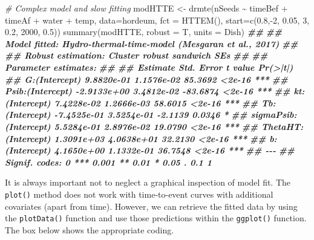 \documentclass[
]{book}
\newenvironment{Shaded}{\begin{snugshade}}{\end{snugshade}}
\newcommand{\AttributeTok}[1]{\textcolor[rgb]{0.77,0.63,0.00}{#1}}
\newcommand{\CommentTok}[1]{\textcolor[rgb]{0.56,0.35,0.01}{\textit{#1}}}
\newcommand{\DecValTok}[1]{\textcolor[rgb]{0.00,0.00,0.81}{#1}}
\newcommand{\DocumentationTok}[1]{\textcolor[rgb]{0.56,0.35,0.01}{\textbf{\textit{#1}}}}
\newcommand{\FloatTok}[1]{\textcolor[rgb]{0.00,0.00,0.81}{#1}}
\newcommand{\FunctionTok}[1]{\textcolor[rgb]{0.00,0.00,0.00}{#1}}
\newcommand{\NormalTok}[1]{#1}
\newcommand{\OtherTok}[1]{\textcolor[rgb]{0.56,0.35,0.01}{#1}}
\newcommand{\SpecialCharTok}[1]{\textcolor[rgb]{0.00,0.00,0.00}{#1}}
\begin{document}
\begin{Shaded}
\begin{Highlighting}[]
\CommentTok{\# Complex model and slow fitting}
\NormalTok{modHTTE }\OtherTok{\textless{}{-}} \FunctionTok{drmte}\NormalTok{(nSeeds }\SpecialCharTok{\textasciitilde{}}\NormalTok{ timeBef }\SpecialCharTok{+}\NormalTok{ timeAf }\SpecialCharTok{+}\NormalTok{ water }\SpecialCharTok{+}\NormalTok{ temp,}
                 \AttributeTok{data=}\NormalTok{hordeum,}
                 \AttributeTok{fct =} \FunctionTok{HTTEM}\NormalTok{(),}
  \AttributeTok{start=}\FunctionTok{c}\NormalTok{(}\FloatTok{0.8}\NormalTok{,}\SpecialCharTok{{-}}\DecValTok{2}\NormalTok{, }\FloatTok{0.05}\NormalTok{, }\DecValTok{3}\NormalTok{, }\FloatTok{0.2}\NormalTok{, }\DecValTok{2000}\NormalTok{, }\FloatTok{0.5}\NormalTok{))}
\FunctionTok{summary}\NormalTok{(modHTTE, }\AttributeTok{robust =}\NormalTok{ T, }\AttributeTok{units =}\NormalTok{ Dish)}
\DocumentationTok{\#\# }
\DocumentationTok{\#\# Model fitted: Hydro{-}thermal{-}time{-}model (Mesgaran et al., 2017)}
\DocumentationTok{\#\# }
\DocumentationTok{\#\# Robust estimation: Cluster robust sandwich SEs }
\DocumentationTok{\#\# }
\DocumentationTok{\#\# Parameter estimates:}
\DocumentationTok{\#\# }
\DocumentationTok{\#\#                          Estimate  Std. Error  t value Pr(\textgreater{}|t|)    }
\DocumentationTok{\#\# G:(Intercept)          9.8820e{-}01  1.1576e{-}02  85.3692   \textless{}2e{-}16 ***}
\DocumentationTok{\#\# Psib:(Intercept)      {-}2.9133e+00  3.4812e{-}02 {-}83.6874   \textless{}2e{-}16 ***}
\DocumentationTok{\#\# kt:(Intercept)         7.4228e{-}02  1.2666e{-}03  58.6015   \textless{}2e{-}16 ***}
\DocumentationTok{\#\# Tb:(Intercept)        {-}7.4525e{-}01  3.5254e{-}01  {-}2.1139   0.0346 *  }
\DocumentationTok{\#\# sigmaPsib:(Intercept)  5.5284e{-}01  2.8976e{-}02  19.0790   \textless{}2e{-}16 ***}
\DocumentationTok{\#\# ThetaHT:(Intercept)    1.3091e+03  4.0638e+01  32.2130   \textless{}2e{-}16 ***}
\DocumentationTok{\#\# b:(Intercept)          4.1650e+00  1.1332e{-}01  36.7548   \textless{}2e{-}16 ***}
\DocumentationTok{\#\# {-}{-}{-}}
\DocumentationTok{\#\# Signif. codes:  0 \textquotesingle{}***\textquotesingle{} 0.001 \textquotesingle{}**\textquotesingle{} 0.01 \textquotesingle{}*\textquotesingle{} 0.05 \textquotesingle{}.\textquotesingle{} 0.1 \textquotesingle{} \textquotesingle{} 1}
\end{Highlighting}
\end{Shaded}

It is always important not to neglect a graphical inspection of model fit. The \texttt{plot()} method does not work with time-to-event curves with additional covariates (apart from time). However, we can retrieve the fitted data by using the \texttt{plotData()} function and use those predictions within the \texttt{ggplot()} function. The box below shows the appropriate coding.
\end{document}
